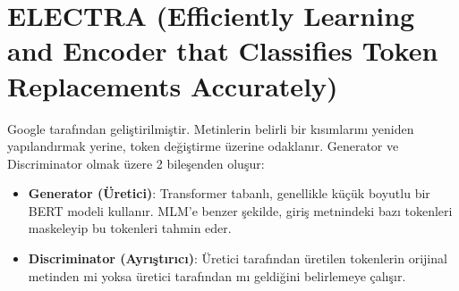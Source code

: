 \section{ELECTRA (Efficiently Learning and Encoder that Classifies Token Replacements Accurately)}
Google tarafından geliştirilmiştir. Metinlerin belirli bir kısımlarını yeniden yapılandırmak yerine, token değiştirme üzerine odaklanır. Generator ve Discriminator olmak üzere 2 bileşenden oluşur:

\begin{itemize}
	\item \textbf{Generator (Üretici)}: Transformer tabanlı, genellikle küçük boyutlu bir BERT modeli kullanır. MLM'e benzer şekilde, giriş metnindeki bazı tokenleri maskeleyip bu tokenleri tahmin eder.
	\item \textbf{Discriminator (Ayrıştırıcı)}: Üretici tarafından üretilen tokenlerin orijinal metinden mi yoksa üretici tarafından mı geldiğini belirlemeye çalışır.
\end{itemize}

\newpage